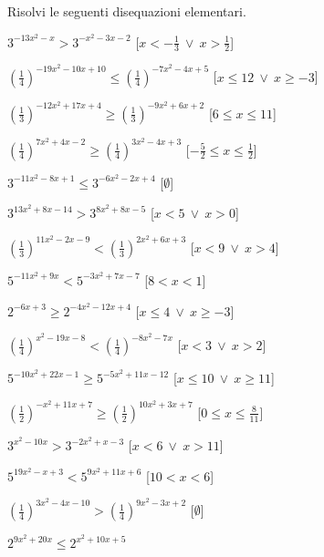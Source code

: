 \begin{esercizio}\label{ese:}
 Risolvi le seguenti disequazioni elementari.
 \begin{enumeratea}
  \item  \(3^{-13 x^2 - x } > 3^{- x^2 -3 x -2}\)
   \hfill [\(x < -\frac{1}{3}~\vee~x > \frac{1}{2}\)]
  \item  \(\left(\frac{1}{4}\right)^{-19 x^2 -10 x +10} \leqslant 
\left(\frac{1}{4}\right)^{-7 x^2 -4 x +5}\)
   \hfill [\(x \leqslant 12~\vee~x \geqslant -3\)]
  \item  \(\left(\frac{1}{3}\right)^{-12 x^2 +17 x +4} \geqslant 
\left(\frac{1}{3}\right)^{-9 x^2 +6 x +2}\)
   \hfill [\(6 \leqslant x \leqslant 11\)]
  \item  \(\left(\frac{1}{4}\right)^{7 x^2 +4 x -2} \geqslant 
\left(\frac{1}{4}\right)^{3 x^2 -4 x +3}\)
   \hfill [\(-\frac{5}{2} \leqslant x \leqslant \frac{1}{2}\)]
  \item  \(3^{-11 x^2 -8 x +1} \leqslant 3^{-6 x^2 -2 x +4}\)
   \hfill [\(\emptyset\)]
  \item  \(3^{13 x^2 +8 x -14} > 3^{8 x^2 +8 x -5}\)
   \hfill [\(x < 5~\vee~x > 0\)]
  \item  \(\left(\frac{1}{3}\right)^{11 x^2 -2 x -9} < 
\left(\frac{1}{3}\right)^{2 x^2 +6 x +3}\)
   \hfill [\(x < 9~\vee~x > 4\)]
  \item  \(5^{-11 x^2 +9 x } < 5^{-3 x^2 +7 x -7}\)
   \hfill [\(8 < x < 1\)]
  \item  \(2^{-6 x +3} \geqslant 2^{-4 x^2 -12 x +4}\)
   \hfill [\(x \leqslant 4~\vee~x \geqslant -3\)]
  \item  \(\left(\frac{1}{4}\right)^{x^2 -19 x -8} < 
\left(\frac{1}{4}\right)^{-8 x^2 -7 x }\)
   \hfill [\(x < 3~\vee~x > 2\)]
  \item  \(5^{-10 x^2 +22 x -1} \geqslant 5^{-5 x^2 +11 x -12}\)
   \hfill [\(x \leqslant 10~\vee~x \geqslant 11\)]
  \item  \(\left(\frac{1}{2}\right)^{- x^2 +11 x +7} \geqslant 
\left(\frac{1}{2}\right)^{10 x^2 +3 x +7}\)
   \hfill [\(0 \leqslant x \leqslant \frac{8}{11}\)]
  \item  \(3^{x^2 -10 x } > 3^{-2 x^2 + x -3}\)
   \hfill [\(x < 6~\vee~x > 11\)]
  \item  \(5^{19 x^2 - x +3} < 5^{9 x^2 +11 x +6}\)
   \hfill [\(10 < x < 6\)]
  \item  \(\left(\frac{1}{4}\right)^{3 x^2 -4 x -10} > 
\left(\frac{1}{4}\right)^{9 x^2 -3 x +2}\)
   \hfill [\(\emptyset\)]
  \item  \(2^{9 x^2 +20 x } \leqslant 2^{x^2 +10 x +5}\)

\end{enumeratea}
\end{esercizio}
